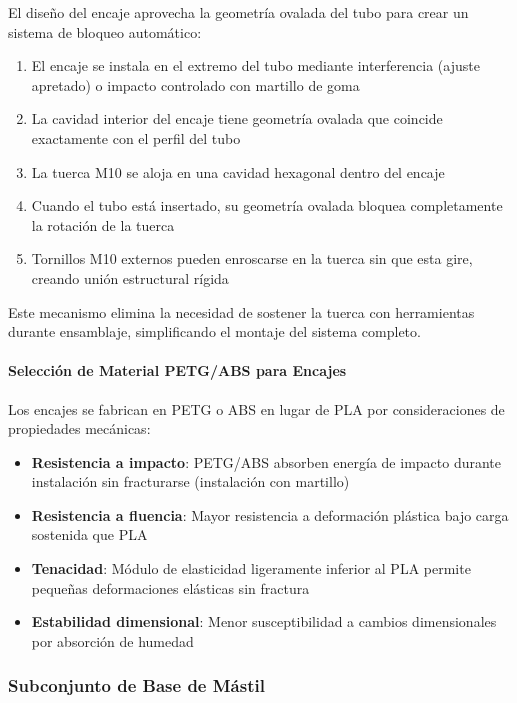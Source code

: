 El diseño del encaje aprovecha la geometría ovalada del tubo para crear un sistema de bloqueo automático:

\begin{enumerate}
    \item El encaje se instala en el extremo del tubo mediante interferencia (ajuste apretado) o impacto controlado con martillo de goma
    \item La cavidad interior del encaje tiene geometría ovalada que coincide exactamente con el perfil del tubo
    \item La tuerca M10 se aloja en una cavidad hexagonal dentro del encaje
    \item Cuando el tubo está insertado, su geometría ovalada bloquea completamente la rotación de la tuerca
    \item Tornillos M10 externos pueden enroscarse en la tuerca sin que esta gire, creando unión estructural rígida
\end{enumerate}

Este mecanismo elimina la necesidad de sostener la tuerca con herramientas durante ensamblaje, simplificando el montaje del sistema completo.

\paragraph{Selección de Material PETG/ABS para Encajes}

Los encajes se fabrican en PETG o ABS en lugar de PLA por consideraciones de propiedades mecánicas:

\begin{itemize}
    \item \textbf{Resistencia a impacto}: PETG/ABS absorben energía de impacto durante instalación sin fracturarse (instalación con martillo)
    \item \textbf{Resistencia a fluencia}: Mayor resistencia a deformación plástica bajo carga sostenida que PLA
    \item \textbf{Tenacidad}: Módulo de elasticidad ligeramente inferior al PLA permite pequeñas deformaciones elásticas sin fractura
    \item \textbf{Estabilidad dimensional}: Menor susceptibilidad a cambios dimensionales por absorción de humedad
\end{itemize}

\subsubsection{Subconjunto de Base de Mástil}

